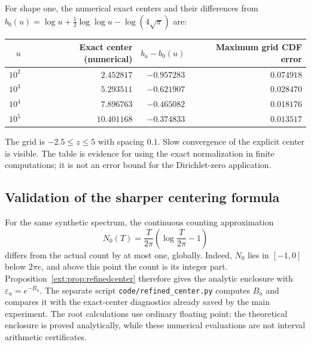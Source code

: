 \documentclass[11pt]{article}
\theoremstyle{definition}
\theoremstyle{remark}
\begin{document}
For shape one, the numerical exact centers and their differences from
$b_0(u)=\log u+\tfrac12\log\log u-\log(4\sqrt\pi)$ are:
\begin{center}
\begin{tabular}{@{}rrrr@{}}
\toprule
$u$ & Exact center (numerical) & $b_u-b_0(u)$ & Maximum grid CDF error\\
\midrule
$10^2$ & $2.452817$ & $-0.957283$ & $0.074918$\\
$10^3$ & $5.293511$ & $-0.621907$ & $0.028470$\\
$10^4$ & $7.896763$ & $-0.465082$ & $0.018176$\\
$10^5$ & $10.401168$ & $-0.374833$ & $0.013517$\\
\bottomrule
\end{tabular}
\end{center}
The grid is $-2.5\le z\le5$ with spacing $0.1$. Slow convergence of the
explicit center is visible. The table is evidence for using the exact
normalization in finite computations; it is not an error bound for the
Dirichlet-zero application.

\subsection{Validation of the sharper centering formula}

For the same synthetic spectrum, the continuous counting approximation
\[
 N_0(T)=\frac{T}{2\pi}\left(\log\frac{T}{2\pi}-1\right)
\]
differs from the actual count by at most one, globally. Indeed, $N_0$
lies in $[-1,0]$ below $2\pi e$, and above this point the count is its
integer part. Proposition~\ref{ext:prop:refinedcenter} therefore gives
the analytic enclosure with $\varepsilon_u=e^{-B_u}$. The separate
script \texttt{code/refined\_center.py} computes $B_u$ and compares it
with the exact-center diagnostics already saved by the main experiment.
The root calculations use ordinary floating point; the theoretical
enclosure is proved analytically, while these numerical evaluations
are not interval arithmetic certificates.
\end{document}
